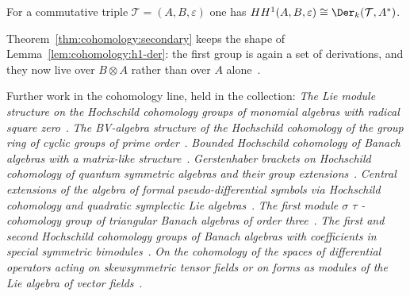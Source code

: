 \begin{theorem}\label{thm:cohomology:secondary}
For a commutative triple $\mathcal{T} = (A, B, \varepsilon)$ one has
$HH^1(A, B, \varepsilon) \cong \Der_k(\mathcal{T}, A^*)$.
\end{theorem}

Theorem~\ref{thm:cohomology:secondary} keeps the shape of
Lemma~\ref{lem:cohomology:h1-der}: the first group is again a set of
derivations, and they now live over $B\otimes A$ rather than over $A$
alone~\cite[Theorem~3.6, pp.~5--6]{BennettHeilLaubacher2023}.

Further work in the cohomology line, held in the collection:
\noindent\emph{The Lie module structure on the Hochschild cohomology groups of monomial algebras with radical square zero}~\cite{LibTheLieModuleStructure2008}.
\noindent\emph{The BV-algebra structure of the Hochschild cohomology of the group ring of cyclic groups of prime order}~\cite{LibTheBvAlgebraStructure2016}.
\noindent\emph{Bounded Hochschild cohomology of Banach algebras with a matrix-like structure}~\cite{LibBoundedHochschildCohomologyOf2006}.
\noindent\emph{Gerstenhaber brackets on Hochschild cohomology of quantum symmetric algebras and their group extensions}~\cite{LibGerstenhaberBracketsOnHochschild2016}.
\noindent\emph{Central extensions of the algebra of formal pseudo-differential symbols via Hochschild cohomology and quadratic symplectic Lie algebras}~\cite{LibCentralExtensionsOfThe2018}.
\noindent\emph{The first module $\sigma$ $\tau$ -cohomology group of triangular Banach algebras of order three}~\cite{LibTheFirstModuleCohomology2018}.
\noindent\emph{The first and second Hochschild cohomology groups of Banach algebras with coefficients in special symmetric bimodules}~\cite{LibTheFirstAndSecond2020}.
\noindent\emph{On the cohomology of the spaces of differential operators acting on skewsymmetric tensor fields or on forms as modules of the Lie algebra of vector fields}~\cite{LibOnTheCohomologyOf2004}.
